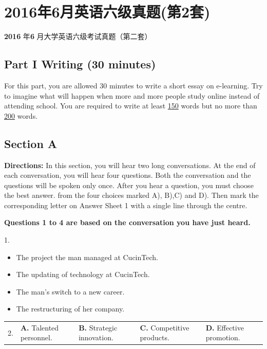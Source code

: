 \documentclass[UTF8,11pt]{ctexart}
\begin{document}
\section*{2016年6月英语六级真题(第2套)}
\textbf{2016} 年\textbf{6} 月大学英语六级考试真题（第二套）


\subsection*{\textbf{Part I Writing (30 minutes)}}


For this part, you are allowed 30 minutes to write a short essay on e-learning. Try to imagine what will happen when more and more people study online instead of attending school. You are required to write at least \uline{150} words but no more than\uline{ 200} words.


\subsection*{\textbf{Section A}}


\textbf{Directions:} In this section, you will hear two long conversations. At the end of each conversation, you will hear four questions. Both the conversation and the questions will be spoken only once. After you hear a question, you must choose the best answer. from the four choices marked A), B),C) and D). Then mark the corresponding letter on Answer Sheet 1 with a single line through the centre.


\textbf{Questions 1 to 4 are based on the conversation you have just heard.}


1.


\begin{itemize}[leftmargin=2em,itemsep=.2em,topsep=.4em]\item[A.] The project the man managed at CucinTech.
\item[B.] The updating of technology at CucinTech.
\item[C.] The man's switch to a new career.
\item[D.] The restructuring of her company.
\end{itemize}

\noindent\begin{tabularx}{\linewidth}{@{}lXXXX@{}}2. & \textbf{A.} Talented personnel. & \textbf{B.} Strategic innovation. & \textbf{C.} Competitive products. & \textbf{D.} Effective promotion.\\\end{tabularx}\par
\end{document}
